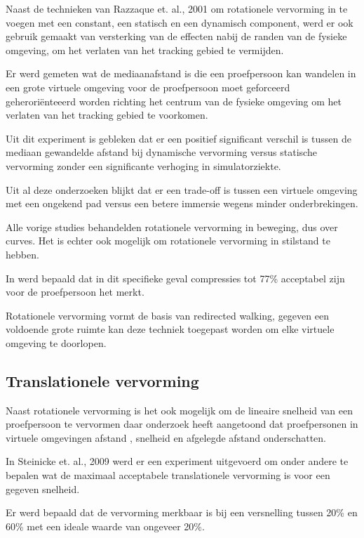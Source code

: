 Naast de technieken van Razzaque et. al., 2001 \cite{kohn01} om rotationele
vervorming in te voegen met een constant, een statisch en een dynamisch 
component, werd er ook gebruik gemaakt van versterking van de effecten nabij de 
randen van de fysieke omgeving, om het verlaten van het tracking gebied te 
vermijden.

Er werd gemeten wat de mediaanafstand is die een proefpersoon kan wandelen in 
een grote virtuele omgeving voor de proefpersoon moet geforceerd 
geherori\"enteeerd worden richting het centrum van de fysieke omgeving om het 
verlaten van het tracking gebied te voorkomen.

Uit dit experiment is gebleken dat er een positief significant verschil is tussen
de mediaan gewandelde afstand bij dynamische vervorming versus statische
vervorming zonder een significante verhoging in simulatorziekte.

Uit al deze onderzoeken blijkt dat er een trade-off is tussen een virtuele 
omgeving met een ongekend pad\cite{neth12} versus een betere immersie wegens 
minder onderbrekingen\cite{engel08,kohn01}. 

Alle vorige studies behandelden rotationele vervorming in beweging, dus over 
curves. Het is echter ook mogelijk om rotationele vervorming in stilstand te
hebben.

In \cite{steinicke09} werd bepaald dat in dit specifieke geval compressies tot
77\% acceptabel zijn voor de proefpersoon het merkt.

Rotationele vervorming vormt de basis van redirected walking, gegeven een
voldoende grote ruimte kan deze techniek toegepast worden om elke virtuele
omgeving te doorlopen.


\subsection{Translationele vervorming}
Naast rotationele vervorming is het ook mogelijk om de lineaire snelheid van een
proefpersoon te vervormen daar onderzoek heeft aangetoond dat proefpersonen in 
virtuele omgevingen afstand \cite{loomis03}, snelheid \cite{banton05} en 
afgelegde afstand \cite{frenz07} onderschatten.

In Steinicke et. al., 2009 \cite{steinicke09} werd er een experiment uitgevoerd 
om onder andere te bepalen wat de maximaal acceptabele translationele vervorming 
is voor een gegeven snelheid.

Er werd bepaald dat de vervorming merkbaar is bij een versnelling tussen 20\% en
60\% met een ideale waarde van ongeveer 20\%.

